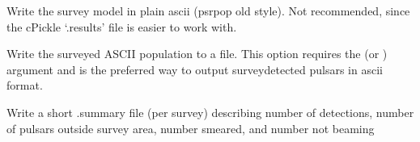 \documentclass[letterpaper,10pt,english]{sphinxmanual}
\begin{document}

\begin{fulllineitems}
\label{\detokenize{cmd-line-docs:cmdoption-dosurvey.py-asc}}
\pysigstartsignatures
\pysigline
{\sphinxcode{\sphinxupquote{}}}
\pysigstopsignatures
\sphinxAtStartPar
Write the survey model in plain ascii (psrpop old style). Not recommended,
since the cPickle ‘.results’ file is easier to work with.

\end{fulllineitems}


\begin{fulllineitems}
\label{\detokenize{cmd-line-docs:cmdoption-dosurvey.py-wS}}
\pysigstartsignatures
\pysigline
{}
\pysigstopsignatures
\sphinxAtStartPar
Write the surveyed ASCII population to a file. This option requires the
 (or ) argument and is the preferred way to output
survey\sphinxhyphen{}detected pulsars in ascii format.

\end{fulllineitems}


\begin{fulllineitems}
\label{\detokenize{cmd-line-docs:cmdoption-dosurvey.py-summary}}
\pysigstartsignatures
\pysigline
{\sphinxcode{\sphinxupquote{}}}
\pysigstopsignatures
\sphinxAtStartPar
Write a short .summary file (per survey) describing number of detections,
number of pulsars outside survey area, number smeared, and number not beaming

\end{fulllineitems}
\end{document}
